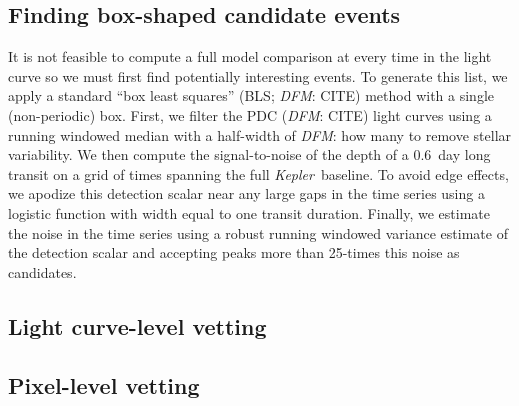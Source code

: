 \documentclass[twocolumn]{aastex6}
\newcommand{\project}[1]{\textsl{#1}}
\newcommand{\kepler}{\project{Kepler}}
\newcommand{\todo}[3]{{\color{#2}\emph{#1}: #3}}
\newcommand{\dfmtodo}[1]{\todo{DFM}{red}{#1}}
\begin{document}

\subsection{Finding box-shaped candidate events}

It is not feasible to compute a full model comparison at every time in the
light curve so we must first find potentially interesting events.
To generate this list, we apply a standard ``box least squares'' (BLS;
\dfmtodo{CITE}) method with a single (non-periodic) box.
First, we filter the PDC (\dfmtodo{CITE}) light curves using a running
windowed median with a half-width of \dfmtodo{how many} to remove stellar
variability.
We then compute the signal-to-noise of the depth of a 0.6~day long transit on
a grid of times spanning the full \kepler\ baseline.
To avoid edge effects, we apodize this detection scalar near any large gaps in
the time series using a logistic function with width equal to one transit
duration.
Finally, we estimate the noise in the time series using a robust running
windowed variance estimate of the detection scalar and accepting peaks more
than 25-times this noise as candidates.

\subsection{Light curve-level vetting}



\subsection{Pixel-level vetting}
\end{document}
